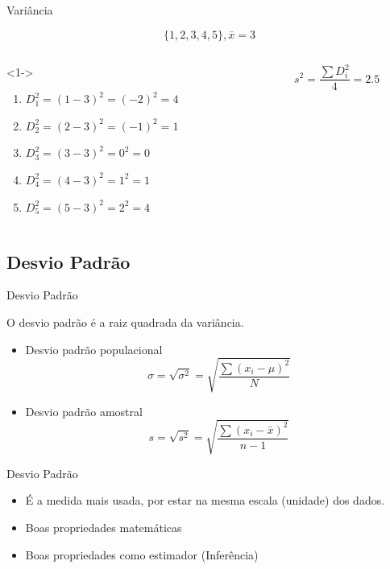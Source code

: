 \documentclass{beamer}
\begin{document}
\begin{frame}{Variância}
  \begin{example}
      \begin{displaymath}
    \{1,2,3,4,5\}, \bar{x} = 3
  \end{displaymath}
  \begin{columns}
    \begin{column}{6cm}<1->
      \begin{enumerate}
      \item $D_1^2 = (1-3)^2 = (-2)^2 = 4$
      \item $D_2^2 = (2-3)^2 = (-1)^2 = 1$
      \item $D_3^2 = (3-3)^2 = 0^2 =0$
      \item $D_4^2 = (4-3)^2 = 1^2 = 1$
      \item $D_5^2 = (5-3)^2 = 2^2 = 4 $
      \end{enumerate}
    \end{column}
    \begin{column}{4cm}
      \begin{displaymath}
        s^2 = \frac{\sum D_i^2}{4} = 2.5
      \end{displaymath}
    \end{column}
  \end{columns}
  \end{example}
\end{frame}

\subsection{Desvio Padrão}
\begin{frame}{Desvio Padrão}
  \begin{definition}
    O desvio padrão é a raiz quadrada da variância.
  \end{definition}
  \begin{itemize}
  \item Desvio padrão populacional
    $$ \sigma = \sqrt{ \sigma^2 } = \sqrt{ \frac{\sum (x_i - \mu)^2}{N} } $$
  \item Desvio padrão amostral
    $$ s = \sqrt{s^2 } = \sqrt{ \frac{\sum (x_i - \bar{x})^2}{n-1} } $$
  \end{itemize}
\end{frame}

\begin{frame}{Desvio Padrão}
  \begin{itemize}
  \item É a medida mais usada, por estar na mesma escala (unidade) dos
    dados.
  \item Boas propriedades matemáticas
  \item Boas propriedades como estimador (Inferência)
  \end{itemize}
\end{frame}
\end{document}
